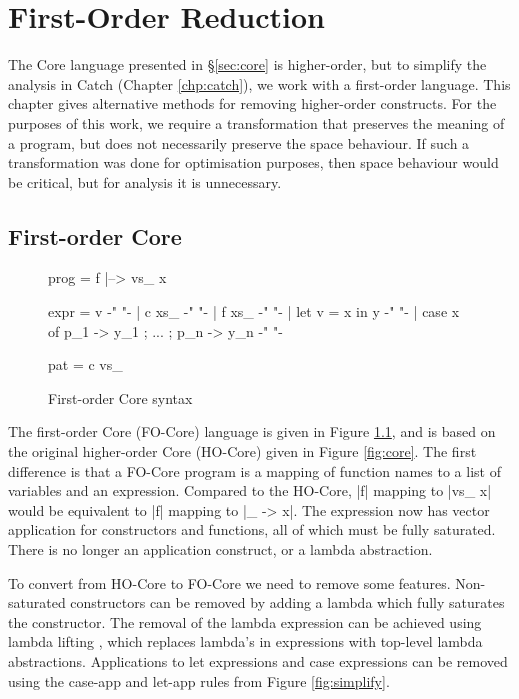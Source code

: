 

\chapter{First-Order Reduction}

The Core language presented in \S\ref{sec:core} is higher-order, but to simplify the analysis in Catch (Chapter \ref{chp:catch}), we work with a first-order language. This chapter gives alternative methods for removing higher-order constructs. For the purposes of this work, we require a transformation that preserves the meaning of a program, but does not necessarily preserve the space behaviour. If such a transformation was done for optimisation purposes, then space behaviour would be critical, but for analysis it is unnecessary.

\section{First-order Core}

\begin{figure}
\begin{code}
prog  =  f |--> vs_ x

expr  =  v                                          {-"  "-}
      |  c xs_                                      {-"  "-}
      |  f xs_                                      {-"  "-}
      |  let v = x in y                             {-"  "-}
      |  case x of {p_1 -> y_1 ; ... ; p_n -> y_n}  {-"  "-}

pat   =  c vs_
\end{code}
\caption{First-order Core syntax}
\label{fig:fo_core}
\end{figure}

The first-order Core (FO-Core) language is given in Figure \ref{fig:fo_core}, and is based on the original higher-order Core (HO-Core) given in Figure \ref{fig:core}. The first difference is that a FO-Core program is a mapping of function names to a list of variables and an expression. Compared to the HO-Core, |f| mapping to |vs_ x| would be equivalent to |f| mapping to |\vs_ -> x|. The expression now has vector application for constructors and functions, all of which must be fully saturated. There is no longer an application construct, or a lambda abstraction.

To convert from HO-Core to FO-Core we need to remove some features. Non-saturated constructors can be removed by adding a lambda which fully saturates the constructor. The removal of the lambda expression can be achieved using lambda lifting \cite{lambda_lift}, which replaces lambda's in expressions with top-level lambda abstractions. Applications to let expressions and case expressions can be removed using the case-app and let-app rules from Figure \ref{fig:simplify}.

